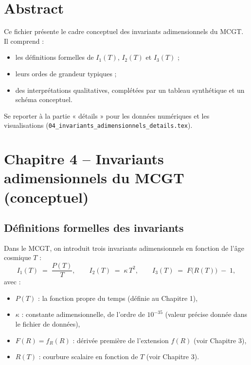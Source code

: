 \section*{Abstract}
Ce fichier présente le cadre conceptuel des invariants adimensionnels du MCGT. Il comprend :
\begin{itemize}
  \item les définitions formelles de $I_{1}(T)$, $I_{2}(T)$ et $I_{3}(T)$ ;
  \item leurs ordes de grandeur typiques ;
  \item des interprétations qualitatives, complétées par un tableau synthétique et un schéma conceptuel.
\end{itemize}
Se reporter à la partie « détails » pour les données numériques et les visualisations (\texttt{04\_invariants\_adimensionnels\_details.tex}).

\bigskip
\section{Chapitre 4 – Invariants adimensionnels du MCGT (conceptuel)}

\subsection{Définitions formelles des invariants}
Dans le MCGT, on introduit trois invariants adimensionnels en fonction de l’âge cosmique $T$ :
\[
  I_{1}(T) \;=\; \frac{P(T)}{T}, 
  \qquad
  I_{2}(T) \;=\; \kappa\,T^{2}, 
  \qquad
  I_{3}(T) \;=\; F\bigl(R(T)\bigr)\;-\;1,
\]
avec :
\begin{itemize}
  \item $P(T)$ : la fonction propre du temps (définie au Chapitre 1),  
  \item $\kappa$ : constante adimensionnelle, de l’ordre de $10^{-35}$ (valeur précise donnée dans le fichier de données),  
  \item $F(R) = f_{R}(R)$ : dérivée première de l’extension $f(R)$ (voir Chapitre 3),  
  \item $R(T)$ : courbure scalaire en fonction de $T$ (voir Chapitre 3).  
\end{itemize}

